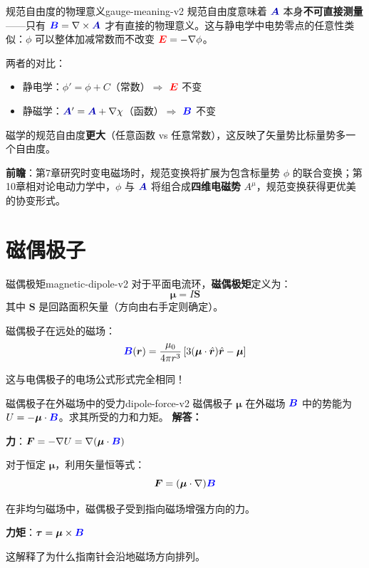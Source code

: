 \documentclass[11pt,a4paper,openany,oneside]{book}
\newcommand{\vecE}{\textcolor{red}{\vect{E}}}
\newcommand{\vecB}{\textcolor{blue}{\vect{B}}}
\newcommand{\vecA}{\textcolor{blue!70!black}{\vect{A}}}
\newcommand{\muz}{\mu_0}
\newcommand{\vect}[1]{\bm{#1}}
\newcommand{\unitvec}[1]{\hat{\vect{#1}}}
\newcommand{\grad}{\nabla}
\newcommand{\curl}{\nabla\times}
\newcommand{\difficulty}[1]{\marginnote{\textcolor{red}{\textbf{[#1]}}}}
\begin{document}
\begin{insight}{规范自由度的物理意义}{gauge-meaning-v2}
规范自由度意味着 $\vecA$ 本身\textbf{不可直接测量}——只有 $\vecB = \curl\vecA$ 才有直接的物理意义。这与静电学中电势零点的任意性类似：$\phi$ 可以整体加减常数而不改变 $\vecE = -\grad\phi$。

两者的对比：
\begin{itemize}
\item 静电学：$\phi' = \phi + C$（常数）$\Rightarrow$ $\vecE$ 不变
\item 静磁学：$\vecA' = \vecA + \grad\chi$（函数）$\Rightarrow$ $\vecB$ 不变
\end{itemize}
磁学的规范自由度\textbf{更大}（任意函数 vs 任意常数），这反映了矢量势比标量势多一个自由度。

\textbf{前瞻}：第7章研究时变电磁场时，规范变换将扩展为包含标量势 $\phi$ 的联合变换；第10章相对论电动力学中，$\phi$ 与 $\vecA$ 将组合成\textbf{四维电磁势} $A^\mu$，规范变换获得更优美的协变形式。
\end{insight}

\section{磁偶极子}

\begin{definition}{磁偶极矩}{magnetic-dipole-v2}
对于平面电流环，\textbf{磁偶极矩}定义为：
\[
\vect{\mu} = I \vect{S}
\]
其中 $\vect{S}$ 是回路面积矢量（方向由右手定则确定）。
\end{definition}

磁偶极子在远处的磁场：
\[
\vecB(\vect{r}) = \frac{\muz}{4\pi r^3} \left[ 3(\vect{\mu}\cdot\unitvec{r})\unitvec{r} - \vect{\mu} \right]
\]

这与电偶极子的电场公式形式完全相同！

\begin{example}{磁偶极子在外磁场中的受力}{dipole-force-v2}
\difficulty{提高}
磁偶极子 $\vect{\mu}$ 在外磁场 $\vecB$ 中的势能为 $U = -\vect{\mu}\cdot\vecB$。求其所受的力和力矩。
\tcblower
\textbf{解答：}

\textbf{力}：$\vect{F} = -\grad U = \grad(\vect{\mu}\cdot\vecB)$

对于恒定 $\vect{\mu}$，利用矢量恒等式：
\[
\vect{F} = (\vect{\mu}\cdot\grad)\vecB
\]

在非均匀磁场中，磁偶极子受到指向磁场增强方向的力。

\textbf{力矩}：$\vect{\tau} = \vect{\mu} \times \vecB$

这解释了为什么指南针会沿地磁场方向排列。
\end{example}
\end{document}

